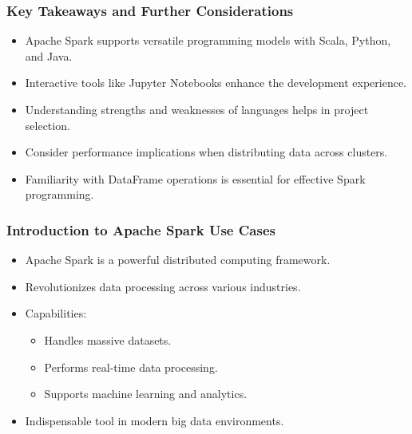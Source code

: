 \documentclass[aspectratio=169]{beamer}
\begin{document}
\begin{frame}[fragile]
    \frametitle{Key Takeaways and Further Considerations}
    \begin{itemize}
        \item Apache Spark supports versatile programming models with Scala, Python, and Java.
        \item Interactive tools like Jupyter Notebooks enhance the development experience.
        \item Understanding strengths and weaknesses of languages helps in project selection.
        \item Consider performance implications when distributing data across clusters.
        \item Familiarity with DataFrame operations is essential for effective Spark programming.
    \end{itemize}
\end{frame}

\begin{frame}[fragile]
    \frametitle{Introduction to Apache Spark Use Cases}
    \begin{itemize}
        \item Apache Spark is a powerful distributed computing framework.
        \item Revolutionizes data processing across various industries.
        \item Capabilities:
            \begin{itemize}
                \item Handles massive datasets.
                \item Performs real-time data processing.
                \item Supports machine learning and analytics.
            \end{itemize}
        \item Indispensable tool in modern big data environments.
    \end{itemize}
\end{frame}
\end{document}
